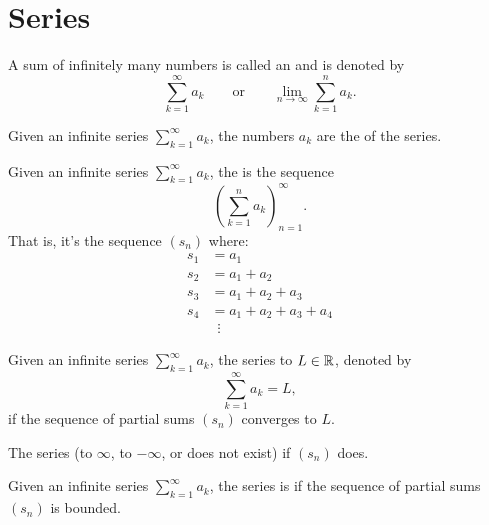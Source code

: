 \chapter{Series}
\begin{definition}
  A sum of infinitely many numbers is called an  and is denoted by
  \[ \sum_{k = 1}^{\infty} a_k \qquad {\text{or}} \qquad \lim_{n \to
  \infty} \sum_{k = 1}^{n} a_k. \]
\end{definition}

\begin{definition}[Terms]
  Given an infinite series $\sum_{k = 1}^{\infty} a_k$, the numbers
  $a_k$ are the  of the series.
\end{definition}

\begin{definition}
  Given an infinite series $\sum_{k = 1}^{\infty} a_k$, the
   is the sequence
  \[ \left(\sum_{k = 1}^{n} a_k\right)_{n = 1}^{\infty}. \]
  That is, it's the sequence $(s_n)$ where:
  \begin{align*}
    s_1 & = a_1 \\
    s_2 & = a_1 + a_2 \\
    s_3 & = a_1 + a_2 + a_3 \\
    s_4 & = a_1 + a_2 + a_3 + a_4 \\
    & \,\,\, \vdots
  \end{align*}
\end{definition}

\begin{definition}
  Given an infinite series $\sum_{k = 1}^{\infty} a_k$, the series
   to $L \in \mathbb R$, denoted by
  \[ \sum_{k = 1}^{\infty} a_k = L, \]
  if the sequence of partial sums $(s_n)$ converges to $L$.

  The series  (to $\infty$, to $-\infty$, or does not
  exist) if $(s_n)$ does.
\end{definition}

\begin{definition}
  Given an infinite series $\sum_{k = 1}^{\infty} a_k$, the series
  is  if the sequence of partial sums $(s_n)$ is bounded.
\end{definition}

